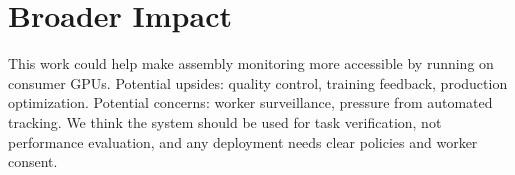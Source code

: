 \documentclass[10pt,twocolumn]{article}
\begin{document}
\section{Broader Impact}
\label{sec:impact}

This work could help make assembly monitoring more accessible by running on consumer GPUs. Potential upsides: quality control, training feedback, production optimization. Potential concerns: worker surveillance, pressure from automated tracking. We think the system should be used for task verification, not performance evaluation, and any deployment needs clear policies and worker consent.

\end{document}

